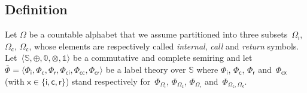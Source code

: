 \documentclass[runningheads]{llncs}
\def\<#1>{\langle #1 \rangle}
\newcommand{\Semiring}{\mathbb{S}}
\newcommand{\zero}{\mathbb{0}}
\newcommand{\one}{\mathbb{1}}
\newcommand{\call}[1]{\ensuremath #1} %
\newcommand{\return}[1]{\ensuremath #1} %
\def\Omegai{{\Omega_\mathsf{i}}}
\def\Omegac{{\Omega_\mathsf{c}}}
\def\Omegar{{\Omega_\mathsf{r}}}
\def\Phii{{\Phi_\mathsf{i}}}
\def\Phic{{\Phi_\mathsf{c}}}
\def\Phir{{\Phi_\mathsf{r}}}
\def\Phici{{\Phi_\mathsf{ci}}}
\def\Phicc{{\Phi_\mathsf{cc}}}
\def\Phicr{{\Phi_\mathsf{cr}}}
\def\Phicx{{\Phi_\mathsf{cx}}}
\begin{document}
\subsection{Definition}\label{se:SWVPA-def}
Let $\Omega$ be a countable alphabet 
that we assume partitioned into three 
subsets~$\Omegai$, $\Omegac$, $\Omegac$,
whose elements are respectively called 
\emph{internal}, \emph{call} and \emph{return} symbols.
Let~$\< \Semiring, \oplus, \zero, \otimes, \one>$ be a commutative and complete semiring and let  
$\bar\Phi = \< \Phii, \Phic, \Phir, \Phici, \Phicc, \Phicr>$ 
be a label theory over $\Semiring$
where $\Phii$, $\Phic$, $\Phir$ and~$\Phicx$ (with $\mathsf{x} \in \{ \mathsf{i}, \mathsf{c}, \mathsf{r}\}$) 
stand respectively 
for~$\Phi_\Omegai$, $\Phi_\Omegac$, $\Phi_\Omegar$ and~$\Phi_{\Omegac, \Omega_\mathsf{x}}$.
%
\end{document}
